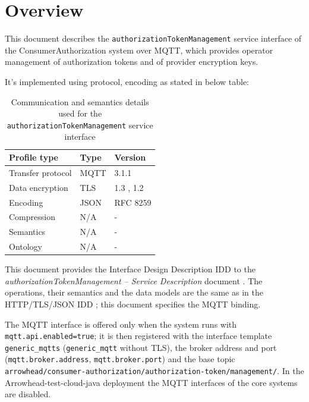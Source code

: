 \documentclass[a4paper]{arrowhead}
\begin{document}
\section{Overview}
\label{sec:overview}

This document describes the \texttt{authorization\allowbreak{}Token\allowbreak{}Management} service interface of the ConsumerAuthorization system over MQTT, which provides operator management of authorization tokens and of provider encryption keys.

It's implemented using protocol, encoding as stated in below table:
\begin{table}[ht!]
  \centering
  \begin{tabular}{|l|l|l|}
    \hline
    \rowcolor{gray!33} Profile type & Type & Version \\ \hline
    Transfer protocol & MQTT & 3.1.1 \cite{mqtt311} \\ \hline
    Data encryption & TLS & 1.3 \cite{rfc8446}, 1.2 \cite{rfc5246} \\ \hline
    Encoding & JSON & RFC 8259 \cite{rfc8259} \\ \hline
    Compression & N/A & - \\ \hline
    Semantics & N/A & - \\ \hline
    Ontology & N/A & - \\ \hline
  \end{tabular}
  \caption{Communication and semantics details used for the \texttt{authorization\allowbreak{}Token\allowbreak{}Management} service interface}
  \label{tab:comunication_semantics_profile}
\end{table}

This document provides the Interface Design Description IDD to the \textit{authorizationTokenManagement -- Service Description} document \cite{ca-authorizationTokenManagement-sd}.
The operations, their semantics and the data models are the same as in the HTTP/TLS/JSON IDD \cite{ca-authorizationTokenManagement-http-idd}; this document specifies the MQTT binding.

The MQTT interface is offered only when the system runs with \texttt{mqtt.api.enabled=true}; it is then registered with the interface template \texttt{generic\_\allowbreak{}mqtts} (\texttt{generic\_\allowbreak{}mqtt} without TLS), the broker address and port (\texttt{mqtt.\allowbreak{}broker.\allowbreak{}address}, \texttt{mqtt.\allowbreak{}broker.\allowbreak{}port}) and the base topic \texttt{arrowhead/\allowbreak{}consumer-\allowbreak{}authorization/\allowbreak{}authorization-\allowbreak{}token/\allowbreak{}management/\allowbreak{}}. In the Arrowhead-test-cloud-java deployment the MQTT interfaces of the core systems are disabled.
\end{document}

